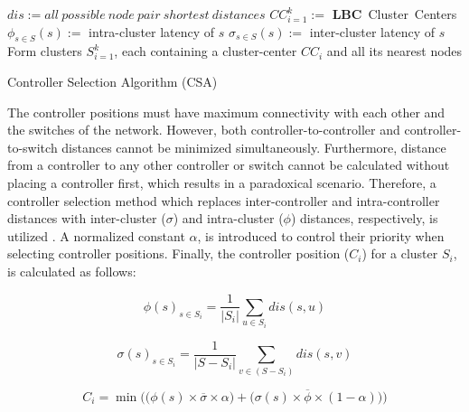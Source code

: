\documentclass[preprint,12pt]{elsarticle}
\begin{document}
	
	\begin{algorithm}
		\SetAlgoLined
		$dis := all~possible~node~pair~shortest~distances$\;
		$CC_{i=1}^k :=$ \textbf{LBC}~Cluster~Centers\;
		$\phi_{s\in S}(s) :=$ intra-cluster latency of $s$\;
		$\sigma_{s\in S}(s) :=$ inter-cluster latency of $s$\;
		Form clusters $S_{i=1}^k$, each containing a cluster-center $CC_i$ and all its nearest nodes\;
		\caption{Controller Selection Algorithm (CSA)} \label{algo:csa}
	\end{algorithm}
	
	The controller positions must have maximum connectivity with each other and the switches of the network. However, both controller-to-controller and controller-to-switch distances cannot be minimized simultaneously. Furthermore, distance from a controller to any other controller or switch cannot be calculated without placing a controller first, which results in a paradoxical scenario. Therefore, a controller selection method which replaces inter-controller and intra-controller distances with inter-cluster ($\sigma$) and intra-cluster ($\phi$) distances, respectively, is utilized \cite{aziz2019degree}. A normalized constant $\alpha$, is introduced to control their priority when selecting controller positions. Finally, the controller position ($C_i$) for a cluster $S_i$, is calculated as follows:
	
	\begin{equation} \label{eqn:intra}
	\phi(s)_{s\in S_i} = \frac{1}{|S_i|}\sum_{u\in S_i} dis(s,u)
	\end{equation}
	
	\begin{equation} \label{eqn:inter}
	\sigma(s)_{s\in S_i} = \frac{1}{|S-S_i|}\sum_{v\in (S-S_i)} dis(s,v)
	\end{equation}
	
	\begin{equation} \label{eqn:totlat}
	C_i = \min\bigg(\big( \phi(s)\times \overline{\sigma} \times \alpha \big) + \big( \sigma(s) \times \overline{\phi} \times (1-\alpha) \big) \bigg)
	\end{equation}
	
\end{document}
